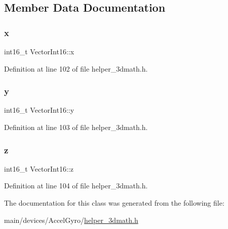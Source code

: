 \subsection{Member Data Documentation}
\mbox{\label{classVectorInt16_a648435b4c99e9da9c95549ac344beaec}} 
\subsubsection{\texorpdfstring{x}{x}}
{\footnotesize\ttfamily int16\+\_\+t Vector\+Int16\+::x}



Definition at line 102 of file helper\+\_\+3dmath.\+h.

\mbox{\label{classVectorInt16_a5d340e1f1bcbc064e5084ca609a6a6a3}} 
\subsubsection{\texorpdfstring{y}{y}}
{\footnotesize\ttfamily int16\+\_\+t Vector\+Int16\+::y}



Definition at line 103 of file helper\+\_\+3dmath.\+h.

\mbox{\label{classVectorInt16_af1b5c4c297bdd32751ab4519480b919f}} 
\subsubsection{\texorpdfstring{z}{z}}
{\footnotesize\ttfamily int16\+\_\+t Vector\+Int16\+::z}



Definition at line 104 of file helper\+\_\+3dmath.\+h.



The documentation for this class was generated from the following file\+:\begin{DoxyCompactItemize}
\item 
main/devices/\+Accel\+Gyro/\mbox{\hyperlink{helper__3dmath_8h}{helper\+\_\+3dmath.\+h}}\end{DoxyCompactItemize}

